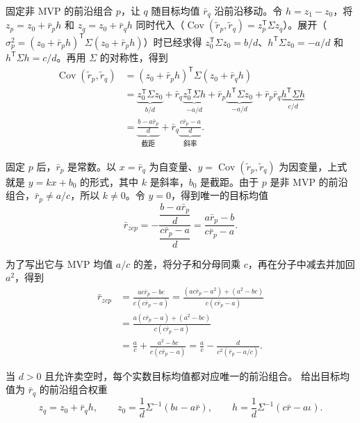 \begin{solution}[label-content={证明},blank-type=none]
固定非 MVP 的前沿组合 $p$，让 $q$ 随目标均值 $\bar r_q$ 沿前沿移动。令 $h=z_1-z_0$，将 $z_p=z_0+\bar r_ph$ 和 $z_q=z_0+\bar r_qh$ 同时代入（$\operatorname{Cov}(\widetilde r_p,\widetilde r_q)=z_p^{\mathsf T}\Sigma z_q$）。展开（$\sigma_p^2=(z_0+\bar r_p h)^{\mathsf T}\Sigma(z_0+\bar r_p h)$）时已经求得 $z_0^{\mathsf T}\Sigma z_0=b/d$、$h^{\mathsf T}\Sigma z_0=-a/d$ 和 $h^{\mathsf T}\Sigma h=c/d$。再用 $\Sigma$ 的对称性，得到
\[
 \begin{aligned}
 \operatorname{Cov}(\widetilde r_p,\widetilde r_q)
 &=(z_0+\bar r_ph)^{\mathsf T}\Sigma(z_0+\bar r_qh)\\
 &=\underbrace{z_0^{\mathsf T}\Sigma z_0}_{b/d}
 +\bar r_q\underbrace{z_0^{\mathsf T}\Sigma h}_{-a/d}
 +\bar r_p\underbrace{h^{\mathsf T}\Sigma z_0}_{-a/d}
 +\bar r_p\bar r_q\underbrace{h^{\mathsf T}\Sigma h}_{c/d}\\
 &=\underbrace{\frac{b-a\bar r_p}{d}}_{\text{截距}}
 +\bar r_q\underbrace{\frac{c\bar r_p-a}{d}}_{\text{斜率}}.
 \end{aligned}
\]

固定 $p$ 后，$\bar r_p$ 是常数。以 $x=\bar r_q$ 为自变量、$y=\operatorname{Cov}(\widetilde r_p,\widetilde r_q)$ 为因变量，上式就是 $y=kx+b_0$ 的形式，其中 $k$ 是斜率，$b_0$ 是截距。由于 $p$ 是非 MVP 的前沿组合，$\bar r_p\ne a/c$，所以 $k\ne0$。令 $y=0$，得到唯一的目标均值
\[
 \bar r_{zcp}
 =-\frac{\dfrac{b-a\bar r_p}{d}}{\dfrac{c\bar r_p-a}{d}}
 =\frac{a\bar r_p-b}{c\bar r_p-a}.
\]

为了写出它与 MVP 均值 $a/c$ 的差，将分子和分母同乘 $c$，再在分子中减去并加回 $a^2$，得到
\[
 \begin{aligned}
 \bar r_{zcp}
 &=\frac{ac\bar r_p-bc}{c(c\bar r_p-a)}
 =\frac{(ac\bar r_p-a^2)+(a^2-bc)}
        {c(c\bar r_p-a)}\\
 &=\frac{a(c\bar r_p-a)+(a^2-bc)}{c(c\bar r_p-a)}\\
 &=\frac ac+\frac{a^2-bc}{c(c\bar r_p-a)}
 =\frac ac-\frac{d}{c^2(\bar r_p-a/c)}.
 \end{aligned}
\]

当 $d>0$ 且允许卖空时，每个实数目标均值都对应唯一的前沿组合。 给出目标均值为 $\bar r_q$ 的前沿组合权重
\[
 z_q=z_0+\bar r_qh,\qquad
 z_0=\frac1d\Sigma^{-1}(b\iota-a\bar r),\qquad
 h=\frac1d\Sigma^{-1}(c\bar r-a\iota).
\]


\end{solution}

